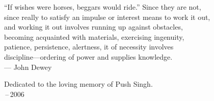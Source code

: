 \thispagestyle{empty}
{}

\vspace*{3cm}

\begin{center}
``If wishes were horses, beggars would ride.''  Since they are not, \\ \medskip
since really to satisfy an impulse or interest means to work it out, \\ \medskip
and working it out involves running up against obstacles, \\ \medskip
becoming acquainted with materials, exercising ingenuity, \\ \medskip
patience, persistence, alertness, it of necessity involves \\ \medskip
discipline---ordering of power and supplies knowledge. \\ \medskip
    --- John Dewey
\end{center}

\medskip

\begin{center}
    Dedicated to the loving memory of Push Singh. \\ \,--\,2006
\end{center}
